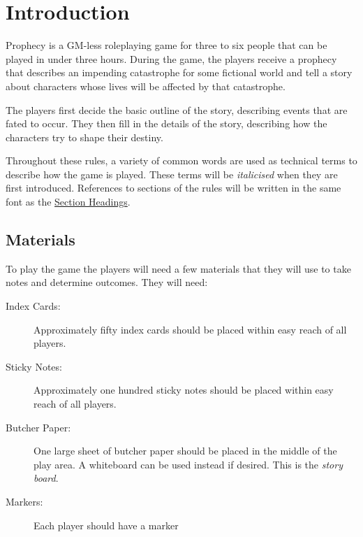 \documentclass[11pt, a5paper, parskip=half-, DIV=12]{scrartcl}
\begin{document}
\setcounter{page}{1}
\setmainfont{TeX Gyre Schola}
\normalsize
\raggedright
\section*{Introduction} \label{section:introduction}
Prophecy is a GM-less roleplaying game for three to six people that can be played in under three hours.
During the game, the players receive a prophecy that describes an impending catastrophe for some fictional world and tell a story about characters whose lives will be affected by that catastrophe. 

The players first decide the basic outline of the story, describing events that are fated to occur. 
 They then fill in the details of the story, describing how the characters try to shape their destiny.

Throughout these rules, a variety of common words are used as technical terms to describe how the game is played.
These terms will be \emph{italicised} when they are first introduced.
References to sections of the rules will be written in the same font as the \hyperref[section:introduction]{\cinzel \small Section Headings}.

\subsection*{Materials} \label{subsection:materials}
To play the game the players will need a few materials that they will use to take notes and determine outcomes.
They will need:
\begin{description}
	\item[Index Cards:] Approximately fifty index cards should be placed within easy reach of all players. 
	\item[Sticky Notes:] Approximately one hundred sticky notes should be placed within easy reach of all players.
	\item[Butcher Paper:] One large sheet of butcher paper should be placed in the middle of the play area.  A whiteboard can be used instead if desired. This is the \emph{story board}.
	\item[Markers:] Each player should have a marker%
\end{description}

\newpage
\ClearShipoutPicture
\setmainfont{Futura}
\Large
{}
\end{document}
